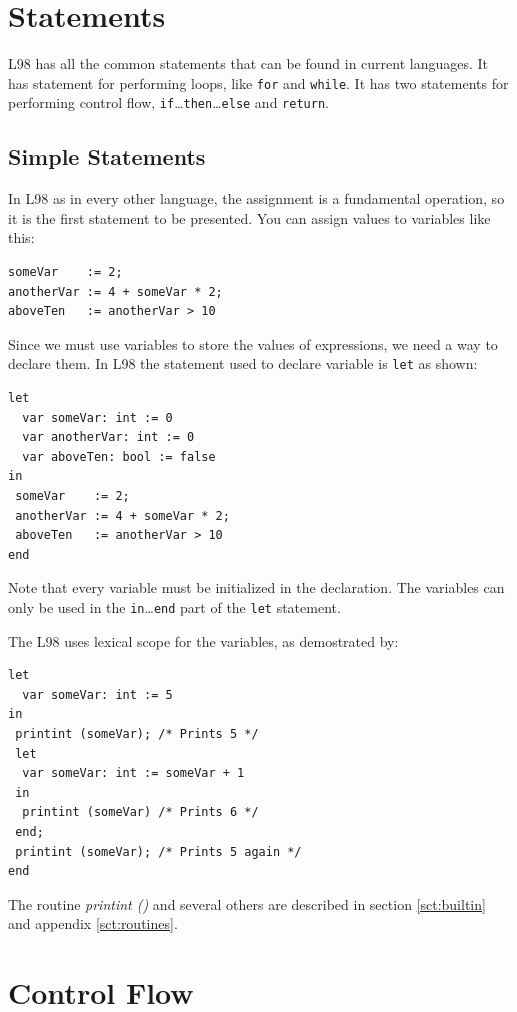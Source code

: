 \documentclass[a4paper, 11pt]{report}
\newcommand{\keyword}[1]{\texttt{#1}}
\begin{document}
\section{Statements}

L98 has all the common statements that can be found in current
languages. It has statement for performing loops, like \keyword{for}
and \keyword{while}. It has two statements for performing control
flow, \keyword{if}\dots\keyword{then}\dots\keyword{else} and
\keyword{return}.

\subsection{Simple Statements}

In L98 as in every other language, the assignment is a fundamental
operation, so it is the first statement to be presented. You can assign
values to variables like this:

\begin{verbatim}
someVar    := 2;
anotherVar := 4 + someVar * 2;
aboveTen   := anotherVar > 10
\end{verbatim}

Since we must use variables to store the values of expressions, we
need a way to declare them. In L98 the statement used to declare
variable is \keyword{let} as shown:

\begin{verbatim}
let
  var someVar: int := 0
  var anotherVar: int := 0
  var aboveTen: bool := false
in
 someVar    := 2;
 anotherVar := 4 + someVar * 2;
 aboveTen   := anotherVar > 10
end
\end{verbatim}

Note that every variable must be initialized in the declaration. The
variables can only be used in the \keyword{in}\dots\keyword{end} part
of the \keyword{let} statement.

The L98 uses lexical scope for the variables, as demostrated by:

\begin{verbatim}
let
  var someVar: int := 5
in
 printint (someVar); /* Prints 5 */
 let
  var someVar: int := someVar + 1
 in
  printint (someVar) /* Prints 6 */
 end;
 printint (someVar); /* Prints 5 again */
end
\end{verbatim}

The routine \emph{printint ()} and several others are described in section \ref{sct:builtin}
and appendix \ref{sct:routines}.

\section{Control Flow}
\end{document}
